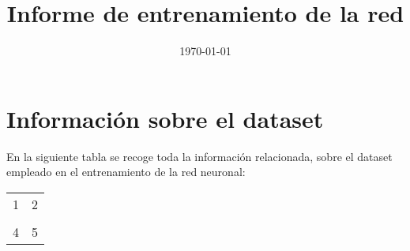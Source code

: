 \documentclass{article}%
\title{Informe de entrenamiento de la red}%
\date{\today}%
\begin{document}
%
\normalsize%
\maketitle%
\section{Información sobre el dataset}%
\label{sec:Informacinsobreeldataset}%
 En la siguiente tabla se recoge toda la información \newline%
         relacionada, sobre el dataset empleado en el entrenamiento de la red neuronal:\newline%
\begin{tabular}{c|c}%
\hline%
1&2\\%
&\\%
4&5\\%
\hline%
\end{tabular}

%
\end{document}
